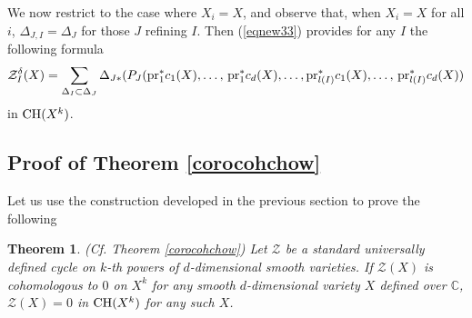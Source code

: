\documentclass[10pt]{article}
\newtheorem{theo}{Theorem}[section]
\begin{document}
We now  restrict to the case where ${X}_i={X}$, and  observe that, when $X_i=X$ for all $i$, $\Delta_{J,I}=\Delta_J$ for those $J$ refining $I$. Then (\ref{eqnew33}) provides for any $I$ the following formula
\begin{eqnarray}
\label{eqpourZavectrick} \mathcal{Z}_I^\delta({X})=\sum_{\Delta_I\subset \Delta_J}\Delta_{J*}(P_J({\rm pr}_1^*c_1(X),\ldots,\,{\rm pr}_1^*c_d(X),\ldots, {\rm pr}_{l(I)}^*c_1(X),\ldots,\,{\rm pr}_{l(I)}^*c_d(X) )
\end{eqnarray}
 in ${\rm CH}({X}^{k})$.


\subsection{Proof of Theorem \ref{corocohchow}\label{subseqnew}}
Let us use the construction developed in the previous section to prove
the following
\begin{theo}\label{corocohchowpasintro}  (Cf.  Theorem  \ref{corocohchow}) Let $\mathcal{Z}$ be  a standard universally defined cycle on
$k$-th  powers
of $d$-dimensional smooth varieties. If $\mathcal{Z}(X)$ is cohomologous to $0$ on $X^k$ for any
smooth $d$-dimensional variety $X$ defined over $\mathbb{C}$, $\mathcal{Z}(X)=0$ in ${\rm CH}(X^k)$ for any
such $X$.
\end{theo}
\end{document}
